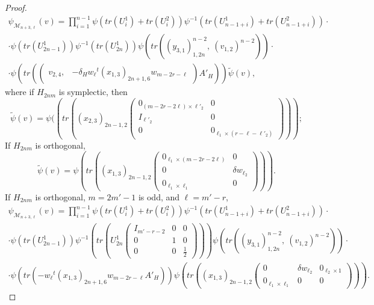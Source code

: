 \documentclass[12pts]{amsart}
\newcommand{\I}{{\mathrm{I}}}
\begin{document}
\begin{proof}
\begin{multline}\label{11.17}
 \psi_{\mathcal{M}_{n+3,\ell}}(v)=\prod_{i=1}^{n-1}\psi(tr(U^1_i)+tr(U^2_i))\psi^{-1}(tr(U^1_{n-1+i})+tr(U^2_{n-1+i}))\cdot \\
 \cdot\psi(tr(U^1_{2n-1}))\psi^{-1}(tr(U^1_{2n}))\psi(tr((y_{3,1})_{1,2n}^{n-2},\ (v_{1,2})^{n-2}))\cdot \\
 \cdot \psi(tr(\begin{pmatrix}v_{2,4},&-\delta_H w_\ell {}^t(x_{1,3})_{2n+1,6}w_{m-2r-\ell}\end{pmatrix}A'_H))\tilde{\psi}(v),
 \end{multline}
where if $H_{2nm}$ is symplectic, then
\begin{equation}\label{11.18}
\tilde{\psi}(v)=\psi((tr((x_{2,3})_{2n-1,2}\begin{pmatrix}0_{(m-2r-2\ell)\times \ell'_2}&0\\I_{\ell'_2}&0\\0&0_{\ell_1\times (r-\ell-\ell'_2)}\end{pmatrix}));
\end{equation}
If $H_{2nm}$ is orthogonal,
\begin{equation}\label{11.19}
\tilde{\psi}(v)=\psi(tr((x_{1,3})_{2n-1,2}\begin{pmatrix}0_{\ell_1\times (m-2r-2\ell)}&0\\0&\delta w_{\ell_2}\\0_{\ell_1\times \ell_1}&0\end{pmatrix})).
\end{equation}
If $H_{2nm}$ is orthogonal, $m=2m'-1$ is odd, and $\ell=m'-r$, 
\begin{multline}\label{11.20}
 \psi_{\mathcal{M}_{n+3,\ell}}(v)=\prod_{i=1}^{n-1}\psi(tr(U^1_i)+tr(U^2_i))\psi^{-1}(tr(U^1_{n-1+i})+tr(U^2_{n-1+i}))\cdot \\
 \cdot\psi(tr(U^1_{2n-1}))\psi^{-1}(tr(U^1_{2n}\begin{pmatrix}I_{m'-r-2}&0&0\\0&1&0\\0&0&\frac{1}{2}\end{pmatrix}))\psi(tr((y_{3,1})_{1,2n}^{n-2},\ (v_{1,2})^{n-2}))\cdot \\
 \cdot \psi(tr(- w_\ell {}^t(x_{1,3})_{2n+1,6}w_{m-2r-\ell}A'_H))
 \psi(tr((x_{1,3})_{2n-1,2}\begin{pmatrix}0&\delta w_{\ell_2}&0_{\ell_2\times 1}\\0_{\ell_1\times \ell_1}&0&0\end{pmatrix})).  
 \end{multline}

\end{proof}
\end{document}

